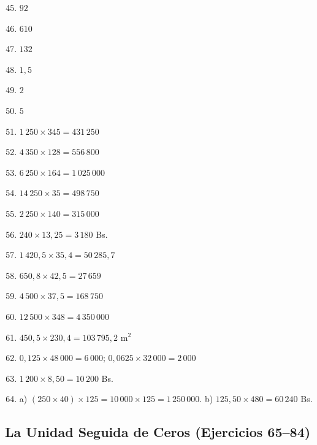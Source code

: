 \documentclass[12pt, letterpaper]{article}
\begin{document}
  \begin{enumerate}[leftmargin=*, label=\textbf{\arabic*.}]
    \setcounter{enumi}{44}
    \item $92$
    \item $610$
    \item $132$
    \item $1{,}5$
    \item $2$
    \item $5$
    \item $1\,250 \times 345 = 431\,250$
    \item $4\,350 \times 128 = 556\,800$
    \item $6\,250 \times 164 = 1\,025\,000$
    \item $14\,250 \times 35 = 498\,750$
    \item $2\,250 \times 140 = 315\,000$
    \item $240 \times 13{,}25 = 3\,180$ Bs.
    \item $1\,420{,}5 \times 35{,}4 = 50\,285{,}7$
    \item $650{,}8 \times 42{,}5 = 27\,659$
    \item $4\,500 \times 37{,}5 = 168\,750$
    \item $12\,500 \times 348 = 4\,350\,000$
    \item $450{,}5 \times 230{,}4 = 103\,795{,}2$ m$^2$
    \item $0{,}125 \times 48\,000 = 6\,000$; \quad $0{,}0625 \times 32\,000 = 2\,000$
    \item $1\,200 \times 8{,}50 = 10\,200$ Bs.
    \item a) $(250 \times 40) \times 125 = 10\,000 \times 125 = 1\,250\,000$. \quad b) $125{,}50 \times 480 = 60\,240$ Bs.
  \end{enumerate}

  \subsection*{La Unidad Seguida de Ceros (Ejercicios 65--84)}
\end{document}
